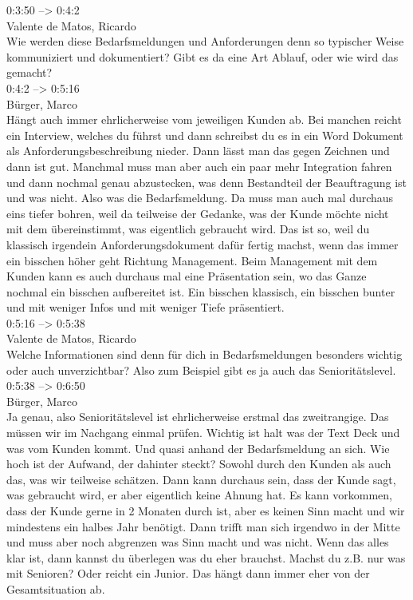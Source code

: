 0:3:50 --> 0:4:2\\
Valente de Matos, Ricardo\\
Wie werden diese Bedarfsmeldungen und Anforderungen denn so typischer Weise kommuniziert und dokumentiert? Gibt es da eine Art Ablauf, oder wie wird das gemacht?\\

0:4:2 --> 0:5:16\\
Bürger, Marco\\
Hängt auch immer ehrlicherweise vom jeweiligen Kunden ab. Bei manchen reicht ein Interview, welches du führst und dann schreibst du es in ein Word Dokument als Anforderungsbeschreibung nieder. Dann lässt man das gegen Zeichnen und dann ist gut. Manchmal muss man aber auch ein paar mehr Integration fahren und dann nochmal genau abzustecken, was denn Bestandteil der Beauftragung ist und was nicht. Also was die Bedarfsmeldung. Da muss man auch mal durchaus eins tiefer bohren, weil da teilweise der Gedanke, was der Kunde möchte nicht mit dem übereinstimmt, was eigentlich gebraucht wird. Das ist so, weil du klassisch irgendein Anforderungsdokument dafür fertig machst, wenn das immer ein bisschen höher geht Richtung Management. Beim Management mit dem Kunden kann es auch durchaus mal eine Präsentation sein, wo das Ganze nochmal ein bisschen aufbereitet ist. Ein bisschen klassisch, ein bisschen bunter und mit weniger Infos und mit weniger Tiefe präsentiert.\\

0:5:16 --> 0:5:38\\
Valente de Matos, Ricardo\\
Welche Informationen sind denn für dich in Bedarfsmeldungen besonders wichtig oder auch unverzichtbar? Also zum Beispiel gibt es ja auch das Senioritätslevel.\\

0:5:38 --> 0:6:50\\
Bürger, Marco\\
Ja genau, also Senioritätslevel ist ehrlicherweise erstmal das zweitrangige. Das müssen wir im Nachgang einmal prüfen. Wichtig ist halt was der Text Deck und was vom Kunden kommt. Und quasi anhand der Bedarfsmeldung an sich. Wie hoch ist der Aufwand, der dahinter steckt? Sowohl durch den Kunden als auch das, was wir teilweise schätzen. Dann kann durchaus sein, dass der Kunde sagt, was gebraucht wird, er aber eigentlich keine Ahnung hat. Es kann vorkommen, dass der Kunde gerne in 2 Monaten durch ist, aber es keinen Sinn macht und wir mindestens ein halbes Jahr benötigt. Dann trifft man sich irgendwo in der Mitte und muss aber noch abgrenzen was Sinn macht und was nicht. Wenn das alles klar ist, dann kannst du überlegen was du eher brauchst. Machst du z.B. nur was mit Senioren? Oder reicht ein Junior. Das hängt dann immer eher von der Gesamtsituation ab.\\

